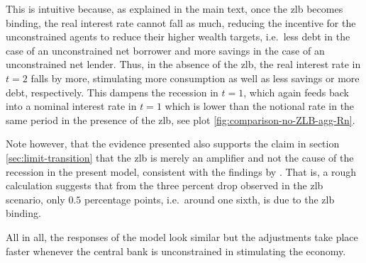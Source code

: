 \documentclass[a4paper,12pt]{article} %
\numberwithin{equation}{section} %
\numberwithin{figure}{section}
\numberwithin{table}{section}
\begin{document}
\begin{refsection}
\begin{appendices}
This is intuitive because, as explained in the main text, once the \Gls{zlb} becomes binding, the real interest rate cannot fall as much, reducing the incentive for the unconstrained agents to reduce their higher wealth targets, i.e.~less debt in the case of an unconstrained net borrower and more savings in the case of an unconstrained net lender. Thus, in the absence of the \Gls{zlb}, the real interest rate in $t=2$ falls by more, stimulating more consumption as well as less savings or more debt, respectively. This dampens the recession in $t=1$, which again feeds back into a nominal interest rate in $t=1$ which is lower than the notional rate in the same period in the presence of the \Gls{zlb}, see plot \ref{fig:comparison-no-ZLB-agg-Rn}.

Note however, that the evidence presented also supports the claim in section \ref{sec:limit-transition} that the \Gls{zlb} is merely an amplifier and not the cause of the recession in the present model, consistent with the findings by \textcite{gl2017}. That is, a rough calculation suggests that from the three percent drop observed in the \Gls{zlb} scenario, only $0.5$ percentage points, i.e.~around one sixth, is due to the \Gls{zlb} binding.

All in all, the responses of the model look similar but the adjustments take place faster whenever the central bank is unconstrained in stimulating the economy. 


\end{appendices}
\end{refsection}
\end{document}

